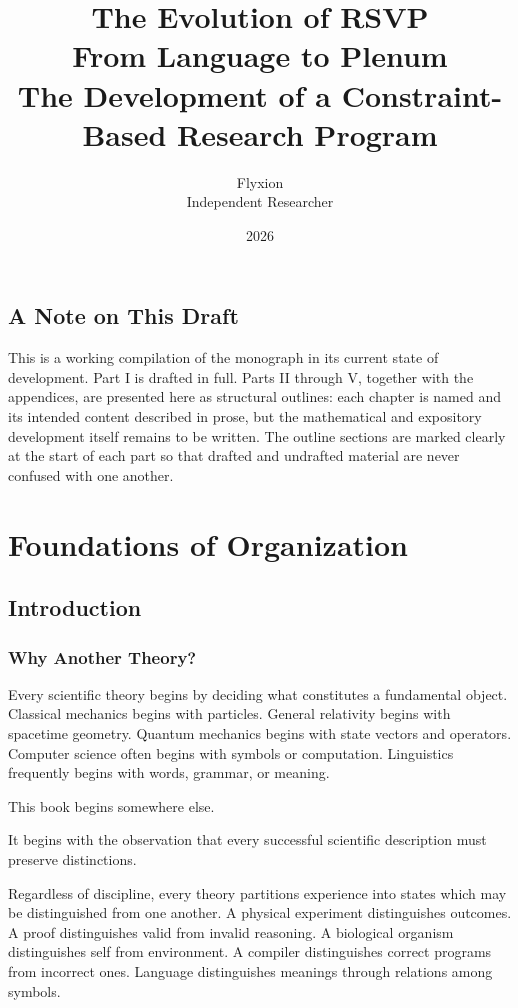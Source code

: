 \documentclass[11pt,oneside]{book}
\title{
The Evolution of RSVP\\[1em]
\Large
From Language to Plenum\\
The Development of a Constraint-Based
Research Program
}
\author{
Flyxion\\
Independent Researcher
}
\date{2026}
\numberwithin{equation}{chapter}
\theoremstyle{definition}
\theoremstyle{plain}
\begin{document}
\frontmatter

\maketitle

\tableofcontents

\chapter*{A Note on This Draft}

This is a working compilation of the monograph in its current state of
development. Part I is drafted in full. Parts II through V, together with
the appendices, are presented here as structural outlines: each chapter is
named and its intended content described in prose, but the mathematical and
expository development itself remains to be written. The outline sections
are marked clearly at the start of each part so that drafted and undrafted
material are never confused with one another.

\mainmatter

\part{Foundations of Organization}

\chapter{Introduction}

\section{Why Another Theory?}

Every scientific theory begins by deciding what constitutes a fundamental
object. Classical mechanics begins with particles. General relativity begins
with spacetime geometry. Quantum mechanics begins with state vectors and
operators. Computer science often begins with symbols or computation.
Linguistics frequently begins with words, grammar, or meaning.

This book begins somewhere else.

It begins with the observation that every successful scientific description
must preserve distinctions.

Regardless of discipline, every theory partitions experience into states
which may be distinguished from one another. A physical experiment
distinguishes outcomes. A proof distinguishes valid from invalid reasoning.
A biological organism distinguishes self from environment. A compiler
distinguishes correct programs from incorrect ones. Language distinguishes
meanings through relations among symbols.
\end{document}
